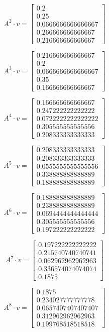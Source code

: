 \documentclass{article}
\begin{document}
$$A^{2} \cdot v = \begin{bmatrix}
0.2\\
0.25\\
0.0666666666666667\\
0.266666666666667\\
0.216666666666667
\end{bmatrix}
$$

$$A^{3} \cdot v = \begin{bmatrix}
0.216666666666667\\
0.2\\
0.0666666666666667\\
0.35\\
0.166666666666667
\end{bmatrix}
$$

$$A^{4} \cdot v = \begin{bmatrix}
0.166666666666667\\
0.247222222222222\\
0.0722222222222222\\
0.305555555555556\\
0.208333333333333
\end{bmatrix}
$$

$$A^{5} \cdot v = \begin{bmatrix}
0.208333333333333\\
0.208333333333333\\
0.0555555555555556\\
0.338888888888889\\
0.188888888888889
\end{bmatrix}
$$

$$A^{6} \cdot v = \begin{bmatrix}
0.188888888888889\\
0.238888888888889\\
0.0694444444444444\\
0.305555555555556\\
0.197222222222222
\end{bmatrix}
$$

$$A^{7} \cdot v = \begin{bmatrix}
0.197222222222222\\
0.215740740740741\\
0.062962962962963\\
0.336574074074074\\
0.1875
\end{bmatrix}
$$

$$A^{8} \cdot v = \begin{bmatrix}
0.1875\\
0.234027777777778\\
0.0657407407407407\\
0.312962962962963\\
0.199768518518518
\end{bmatrix}
$$
\end{document}
